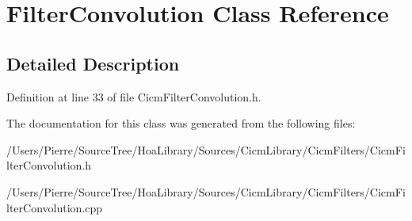 \hypertarget{class_filter_convolution}{\section{Filter\-Convolution Class Reference}
\label{class_filter_convolution}
}


\subsection{Detailed Description}


Definition at line 33 of file Cicm\-Filter\-Convolution.\-h.



The documentation for this class was generated from the following files\-:\begin{DoxyCompactItemize}
\item 
/\-Users/\-Pierre/\-Source\-Tree/\-Hoa\-Library/\-Sources/\-Cicm\-Library/\-Cicm\-Filters/Cicm\-Filter\-Convolution.\-h\item 
/\-Users/\-Pierre/\-Source\-Tree/\-Hoa\-Library/\-Sources/\-Cicm\-Library/\-Cicm\-Filters/Cicm\-Filter\-Convolution.\-cpp\end{DoxyCompactItemize}
